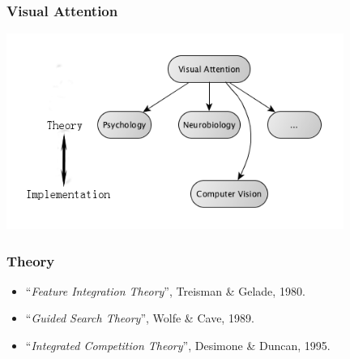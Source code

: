 \documentclass[notheorems,serif,table,compress]{beamer}  %
\begin{document}
\begin{frame}
\end{frame}


\begin{frame}
\frametitle{Visual Attention}
\centering\includegraphics[width=11cm]{fields.png}
\end{frame}


\begin{frame}
\frametitle{Theory}
\begin{itemize}
\item ``{\color{blue}\emph{Feature Integration Theory}}'', Treisman \& Gelade, 1980.
\item ``{\color{blue}\emph{Guided Search Theory}}'', Wolfe \& Cave, 1989.
\item ``{\color{blue}\emph{Integrated Competition Theory}}'', Desimone \& Duncan, 1995.
\end{itemize}
\end{frame}
\end{document}
